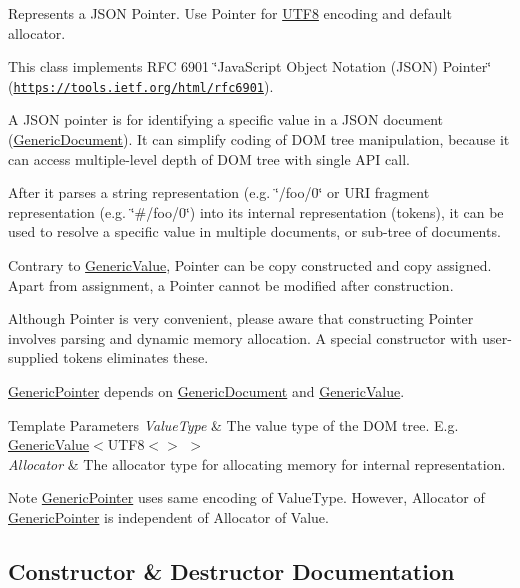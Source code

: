 Represents a J\+S\+ON Pointer. Use Pointer for \hyperlink{struct_u_t_f8}{U\+T\+F8} encoding and default allocator. 

This class implements R\+FC 6901 \char`\"{}\+Java\+Script Object Notation (\+J\+S\+O\+N) Pointer\char`\"{} (\href{https://tools.ietf.org/html/rfc6901}{\tt https\+://tools.\+ietf.\+org/html/rfc6901}).

A J\+S\+ON pointer is for identifying a specific value in a J\+S\+ON document (\hyperlink{class_generic_document}{Generic\+Document}). It can simplify coding of D\+OM tree manipulation, because it can access multiple-\/level depth of D\+OM tree with single A\+PI call.

After it parses a string representation (e.\+g. \char`\"{}/foo/0\char`\"{} or U\+RI fragment representation (e.\+g. \char`\"{}\#/foo/0\char`\"{}) into its internal representation (tokens), it can be used to resolve a specific value in multiple documents, or sub-\/tree of documents.

Contrary to \hyperlink{class_generic_value}{Generic\+Value}, Pointer can be copy constructed and copy assigned. Apart from assignment, a Pointer cannot be modified after construction.

Although Pointer is very convenient, please aware that constructing Pointer involves parsing and dynamic memory allocation. A special constructor with user-\/ supplied tokens eliminates these.

\hyperlink{class_generic_pointer}{Generic\+Pointer} depends on \hyperlink{class_generic_document}{Generic\+Document} and \hyperlink{class_generic_value}{Generic\+Value}.


\begin{DoxyTemplParams}{Template Parameters}
{\em Value\+Type} & The value type of the D\+OM tree. E.\+g. \hyperlink{class_generic_value}{Generic\+Value}$<$U\+T\+F8$<$$>$ $>$ \\
\hline
{\em Allocator} & The allocator type for allocating memory for internal representation.\\
\hline
\end{DoxyTemplParams}
\begin{DoxyNote}{Note}
\hyperlink{class_generic_pointer}{Generic\+Pointer} uses same encoding of Value\+Type. However, Allocator of \hyperlink{class_generic_pointer}{Generic\+Pointer} is independent of Allocator of Value. 
\end{DoxyNote}


\subsection{Constructor \& Destructor Documentation}
